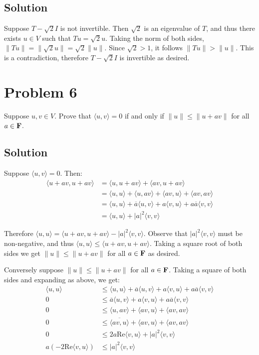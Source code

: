 \documentclass{article}
\begin{document}
\subsection*{Solution}
Suppose $T-\sqrt{2}I$ is not invertible. Then $\sqrt{2}$ is an eigenvalue of $T$, and thus there exists $u\in V$ such that $Tu=\sqrt{2}u$. Taking the norm of both sides, $\|Tu\|=\|\sqrt{2}u\|=\sqrt{2}\|u\|$. Since $\sqrt{2}>1$, it follows $\|Tu\|>\|u\|$. This is a contradiction, therefore $T-\sqrt{2}I$ is invertible as desired.

\section*{Problem 6}
Suppose $u,v\in V$. Prove that $\langle u,v\rangle=0$ if and only if $\|u\|\leq\|u+av\|$ for all $a\in \mathbf{F}$.

\subsection*{Solution}
Suppose $\langle u,v\rangle=0$. Then:
\begin{align*}
    \langle u+av, u+av \rangle&=\langle u,u+av\rangle+\langle av,u+av\rangle\\
    &=\langle u,u\rangle+\langle u,av\rangle+\langle av,u\rangle+\langle av,av\rangle\\
    &=\langle u,u\rangle+\overline{a}\langle u,v\rangle+a\langle v,u\rangle+a\overline{a}\langle v,v\rangle\\
    &=\langle u,u\rangle+|a|^2\langle v,v\rangle
\end{align*}

Therefore $\langle u,u\rangle=\langle u+av, u+av \rangle-|a|^2\langle v,v\rangle$. Observe that $|a|^2\langle v,v\rangle$ must be non-negative, and thus $\langle u,u\rangle\leq\langle u+av, u+av \rangle$. Taking a square root of both sides we get $\|u\|\leq\|u+av\|$ for all $a\in \mathbf{F}$ as desired.

\vs

Conversely suppose $\|u\|\leq\|u+av\|$ for all $a\in \mathbf{F}$. Taking a square of both sides and expanding as above, we get:
\begin{align*}
    \langle u,u\rangle &\leq \langle u,u\rangle+\overline{a}\langle u,v\rangle+a\langle v,u\rangle+a\overline{a}\langle v,v\rangle\\
    0 &\leq \overline{a}\langle u,v\rangle+a\langle v,u\rangle+a\overline{a}\langle v,v\rangle\\
    0 &\leq \langle u,av\rangle+\langle av,u\rangle+\langle av,av\rangle\\
    0 &\leq \overline{\langle av,u\rangle}+\langle av,u\rangle+\langle av,av\rangle\\
    0 &\leq 2a\text{Re} \langle v,u\rangle+|a|^2\langle v,v\rangle\\
    a(-2\text{Re} \langle v,u\rangle) &\leq |a|^2\langle v,v\rangle\\
\end{align*}
\end{document}
